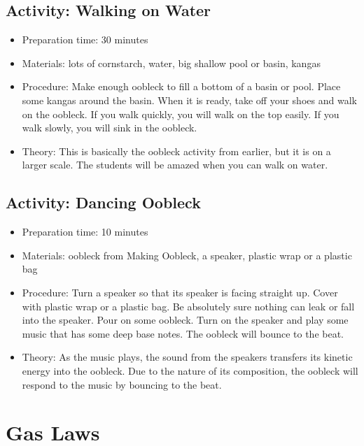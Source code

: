 \begin{itemize}
{\begin{itemize}
\subsection{Activity: Walking on Water}
\begin{itemize}
\item{Preparation time: 30 minutes}
\item{Materials: lots of cornstarch, water, big shallow pool or basin, kangas}
\item{Procedure: Make enough oobleck to fill a bottom of a basin or pool. Place some kangas around the basin. When it is ready, take off your shoes and walk on the oobleck. If you walk quickly, you will walk on the top easily. If you walk slowly, you will sink in the oobleck.}
\item{Theory: This is basically the oobleck activity from earlier, but it is on a larger scale. The students will be amazed when you can walk on water.}
\end{itemize}

\subsection{Activity: Dancing Oobleck}
\begin{itemize}
\item{Preparation time: 10 minutes}
\item{Materials: oobleck from Making Oobleck, a speaker, plastic wrap or a plastic bag}
\item{Procedure: Turn a speaker so that its speaker is facing straight up. Cover with plastic wrap or a plastic bag. Be absolutely sure nothing can leak or fall into the speaker. Pour on some oobleck. Turn on the speaker and play some music that has some deep base notes. The oobleck will bounce to the beat.}
\item{Theory: As the music plays, the sound from the speakers transfers its kinetic energy into the oobleck. Due to the nature of its composition, the oobleck will respond to the music by bouncing to the beat.}
\end{itemize}

\section{Gas Laws}


\end{itemize}}
\end{itemize}
